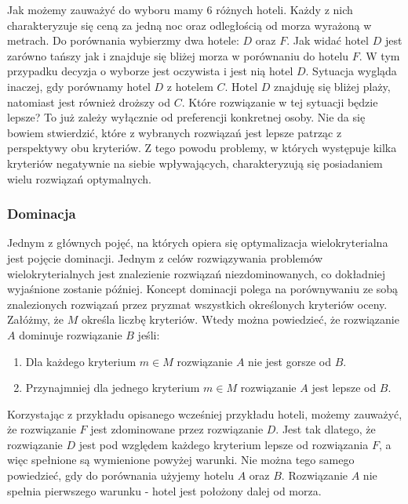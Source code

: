 \documentclass[twoside]{iisthesis}
\begin{document}
Jak możemy zauważyć do wyboru mamy 6 różnych hoteli. Każdy z nich charakteryzuje się ceną za jedną noc oraz odległością od morza wyrażoną w metrach. Do porównania wybierzmy dwa hotele: $D$ oraz $F$. Jak widać hotel $D$ jest zarówno tańszy jak i znajduje się bliżej morza w porównaniu do hotelu $F$. W tym przypadku decyzja o wyborze jest oczywista i jest nią hotel $D$. Sytuacja wygląda inaczej, gdy porównamy hotel $D$ z hotelem $C$. Hotel $D$ znajduję się bliżej plaży, natomiast jest również droższy od $C$. Które rozwiązanie w tej sytuacji będzie lepsze? To już zależy wyłącznie od preferencji konkretnej osoby. Nie da się bowiem stwierdzić, które z wybranych rozwiązań jest lepsze patrząc z perspektywy obu kryteriów. Z tego powodu problemy, w których występuje kilka kryteriów negatywnie na siebie wpływających, charakteryzują się posiadaniem wielu rozwiązań optymalnych.

\subsubsection{Dominacja}
Jednym z głównych pojęć, na których opiera się optymalizacja wielokryterialna jest pojęcie dominacji. Jednym z celów rozwiązywania problemów wielokryterialnych jest znalezienie rozwiązań niezdominowanych, co dokładniej wyjaśnione zostanie później. Koncept dominacji polega na porównywaniu ze sobą znalezionych rozwiązań przez pryzmat wszystkich określonych kryteriów oceny. Załóżmy, że $M$ określa liczbę kryteriów. Wtedy można powiedzieć, że rozwiązanie $A$ dominuje rozwiązanie $B$ jeśli:\\

\begin{enumerate}
	\item Dla każdego kryterium $m \in M$ rozwiązanie $A$ nie jest gorsze od $B$.
	\item Przynajmniej dla jednego kryterium $m \in M$ rozwiązanie $A$ jest lepsze od $B$.\\
\end{enumerate}

Korzystając z przykładu opisanego wcześniej przykładu hoteli, możemy zauważyć, że rozwiązanie $F$ jest zdominowane przez rozwiązanie $D$. Jest tak dlatego, że rozwiązanie $D$ jest pod względem każdego kryterium lepsze od rozwiązania $F$, a więc spełnione są wymienione powyżej warunki. Nie można tego samego powiedzieć, gdy do porównania użyjemy hotelu $A$ oraz $B$. Rozwiązanie $A$ nie spełnia pierwszego warunku - hotel jest położony dalej od morza.
\end{document}
